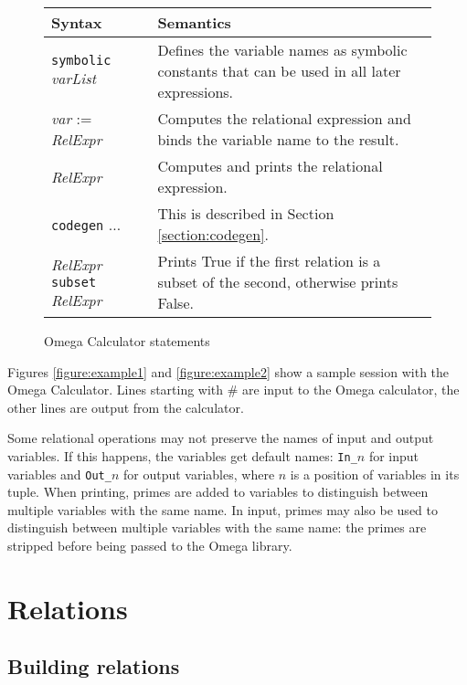 \begin{figure}[tbh]
\begin{tabular}{l|p{4.5in}}
Syntax & Semantics \\\hline

{\tt symbolic} {\em varList} & 
  Defines the variable names as symbolic
  constants that can be used in all later
  expressions. \\

{\em var} := {\em RelExpr} & 
  Computes the relational expression and binds the
  variable name to the result. \\

{\em RelExpr} & 
  Computes and prints the relational expression. 	\\

{\tt codegen} $\ldots$ &
	This is described in Section \ref{section:codegen}.
	\\

{\em RelExpr} {\tt subset} {\em RelExpr} &
  Prints True if the first relation is a subset of the second,
  otherwise prints False. \\
\end{tabular}
\caption{Omega Calculator statements}
\label{IPIstatements}
\end{figure}


Figures \ref{figure:example1} and \ref{figure:example2} show a sample
session with the Omega
Calculator. Lines starting with \# are input to the Omega
calculator, the other lines are output from the calculator.



Some relational operations may not preserve
the names of input and output variables.
If this happens, the variables get default names:
{\tt In\_}$n$ for input variables and
{\tt Out\_}$n$ for output variables,
where $n$ is a position of variables in its tuple.
When printing, primes are added to variables to distinguish
between multiple variables with the same name. 
In input, primes may also be used to distinguish between multiple variables 
with the same name: the primes are stripped before being passed
to the Omega library.

\section{Relations}

\subsection{Building relations}


